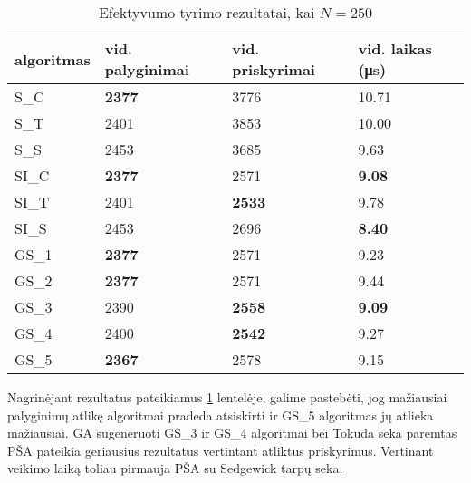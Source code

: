 \documentclass{VUMIFInfKursinis}
\begin{document}
\begin{table}[H]
  \caption{Efektyvumo tyrimo rezultatai, kai $N = 250$}
  \label{results_250}
  \centering
  \begin{tabular}{@{}llll@{}}
  algoritmas & vid. palyginimai                      & vid. priskyrimai                      & vid. laikas (μs)                      \\ \midrule
  S\_C       & \cellcolor[HTML]{70AD47}\textbf{2377} & 3776                                  & 10.71                                 \\
  S\_T       & 2401                                  & 3853                                  & 10.00                                 \\
  S\_S       & 2453                                  & 3685                                  & 9.63                                  \\
  SI\_C      & \cellcolor[HTML]{70AD47}\textbf{2377} & 2571                                  & \cellcolor[HTML]{70AD47}\textbf{9.08} \\
  SI\_T      & 2401                                  & \cellcolor[HTML]{70AD47}\textbf{2533} & 9.78                                  \\
  SI\_S      & 2453                                  & 2696                                  & \cellcolor[HTML]{70AD47}\textbf{8.40} \\
  GS\_1      & \cellcolor[HTML]{70AD47}\textbf{2377} & 2571                                  & 9.23                                  \\
  GS\_2      & \cellcolor[HTML]{70AD47}\textbf{2377} & 2571                                  & 9.44                                  \\
  GS\_3      & 2390                                  & \cellcolor[HTML]{70AD47}\textbf{2558} & \cellcolor[HTML]{70AD47}\textbf{9.09} \\
  GS\_4      & 2400                                  & \cellcolor[HTML]{70AD47}\textbf{2542} & 9.27                                  \\
  GS\_5      & \cellcolor[HTML]{70AD47}\textbf{2367} & 2578                                  & 9.15                                  \\ \bottomrule 
  \end{tabular}
\end{table}

Nagrinėjant rezultatus pateikiamus \ref{results_250} lentelėje, galime pastebėti, jog
mažiausiai palyginimų atlikę algoritmai pradeda atsiskirti ir GS\_5 algoritmas jų atlieka mažiausiai.
GA sugeneruoti GS\_3 ir GS\_4 algoritmai bei Tokuda seka paremtas PŠA pateikia geriausius rezultatus vertintant atliktus priskyrimus.
Vertinant veikimo laiką toliau pirmauja PŠA su Sedgewick tarpų seka.
\end{document}
